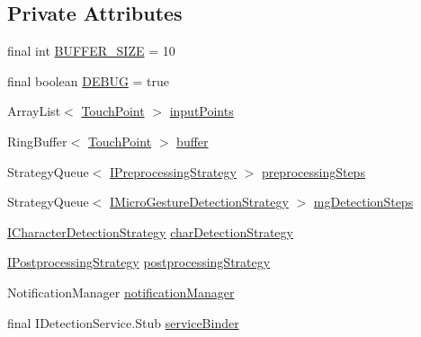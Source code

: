 \subsection*{Private Attributes}
\begin{DoxyCompactItemize}
\item 
final int \hyperlink{classch_1_1zhaw_1_1ba10__bsha__1_1_1service_1_1DetectionService_a9702db5e460b3123f4c475b05ed6942f}{BUFFER\_\-SIZE} = 10
\item 
final boolean \hyperlink{classch_1_1zhaw_1_1ba10__bsha__1_1_1service_1_1DetectionService_a7595c17917add9e9146a3bee444187c9}{DEBUG} = true
\item 
ArrayList$<$ \hyperlink{classch_1_1zhaw_1_1ba10__bsha__1_1_1TouchPoint}{TouchPoint} $>$ \hyperlink{classch_1_1zhaw_1_1ba10__bsha__1_1_1service_1_1DetectionService_a6bf9d1f281b4bc5efb555b742f2ad928}{inputPoints}
\item 
RingBuffer$<$ \hyperlink{classch_1_1zhaw_1_1ba10__bsha__1_1_1TouchPoint}{TouchPoint} $>$ \hyperlink{classch_1_1zhaw_1_1ba10__bsha__1_1_1service_1_1DetectionService_a9188c843a530615bdd8c2e031879224b}{buffer}
\item 
StrategyQueue$<$ \hyperlink{interfacech_1_1zhaw_1_1ba10__bsha__1_1_1strategies_1_1IPreprocessingStrategy}{IPreprocessingStrategy} $>$ \hyperlink{classch_1_1zhaw_1_1ba10__bsha__1_1_1service_1_1DetectionService_a1cf989116feef3dca971827a4d16e56b}{preprocessingSteps}
\item 
StrategyQueue$<$ \hyperlink{interfacech_1_1zhaw_1_1ba10__bsha__1_1_1strategies_1_1IMicroGestureDetectionStrategy}{IMicroGestureDetectionStrategy} $>$ \hyperlink{classch_1_1zhaw_1_1ba10__bsha__1_1_1service_1_1DetectionService_ace6fc1c597f8789a6f7f8048296799a3}{mgDetectionSteps}
\item 
\hyperlink{interfacech_1_1zhaw_1_1ba10__bsha__1_1_1strategies_1_1ICharacterDetectionStrategy}{ICharacterDetectionStrategy} \hyperlink{classch_1_1zhaw_1_1ba10__bsha__1_1_1service_1_1DetectionService_a27bece13d8cc4a8d488f104d078acfeb}{charDetectionStrategy}
\item 
\hyperlink{interfacech_1_1zhaw_1_1ba10__bsha__1_1_1strategies_1_1IPostprocessingStrategy}{IPostprocessingStrategy} \hyperlink{classch_1_1zhaw_1_1ba10__bsha__1_1_1service_1_1DetectionService_addd3104ced0625818552e1c6459269ec}{postprocessingStrategy}
\item 
NotificationManager \hyperlink{classch_1_1zhaw_1_1ba10__bsha__1_1_1service_1_1DetectionService_a805b20b9685b173065d4bbceeb3a73d3}{notificationManager}
\item 
final IDetectionService.Stub \hyperlink{classch_1_1zhaw_1_1ba10__bsha__1_1_1service_1_1DetectionService_a9f24365c090a9ae586420e140fc97e0e}{serviceBinder}
\end{DoxyCompactItemize}

